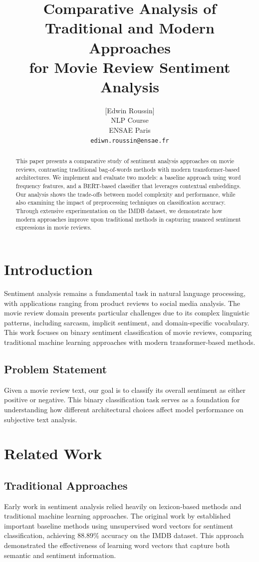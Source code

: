 \documentclass[numbers,nonatbib]{article}
\title{Comparative Analysis of Traditional and Modern Approaches\\for Movie Review Sentiment Analysis}
\author{
    [Edwin Roussin]\\
    NLP Course\\
    ENSAE Paris\\
    \texttt{ediwn.roussin@ensae.fr}
}
\begin{document}
\maketitle

\begin{abstract}
This paper presents a comparative study of sentiment analysis approaches on movie reviews, contrasting traditional bag-of-words methods with modern transformer-based architectures. We implement and evaluate two models: a baseline approach using word frequency features, and a BERT-based classifier that leverages contextual embeddings. Our analysis shows the trade-offs between model complexity and performance, while also examining the impact of preprocessing techniques on classification accuracy. Through extensive experimentation on the IMDB dataset, we demonstrate how modern approaches improve upon traditional methods in capturing nuanced sentiment expressions in movie reviews.
\end{abstract}

\section{Introduction}
Sentiment analysis remains a fundamental task in natural language processing, with applications ranging from product reviews to social media analysis. The movie review domain presents particular challenges due to its complex linguistic patterns, including sarcasm, implicit sentiment, and domain-specific vocabulary. This work focuses on binary sentiment classification of movie reviews, comparing traditional machine learning approaches with modern transformer-based methods.

\subsection{Problem Statement}
Given a movie review text, our goal is to classify its overall sentiment as either positive or negative. This binary classification task serves as a foundation for understanding how different architectural choices affect model performance on subjective text analysis.

\section{Related Work}
\subsection{Traditional Approaches}
Early work in sentiment analysis relied heavily on lexicon-based methods and traditional machine learning approaches. The original work by \cite{maas2011learning} established important baseline methods using unsupervised word vectors for sentiment classification, achieving 88.89\% accuracy on the IMDB dataset. This approach demonstrated the effectiveness of learning word vectors that capture both semantic and sentiment information.
\end{document}
